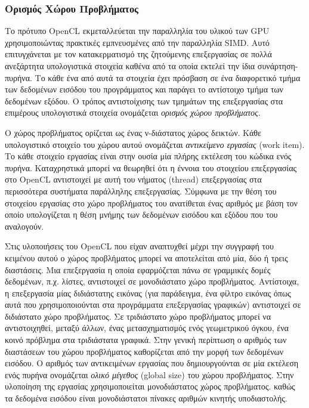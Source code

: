 \subsubsection*{Ορισμός Χώρου Προβλήματος}

\noindent Το πρότυπο OpenCL εκμεταλλεύεται την παραλληλία του υλικού των GPU χρησιμοποιώντας πρακτικές εμπνευσμένες από την παραλληλία SIMD. Αυτό επιτυγχάνεται με τον κατακερματισμό της ζητούμενης επεξεργασίας σε πολλά ανεξάρτητα υπολογιστικά στοιχεία καθένα από τα οποία εκτελεί την ίδια  συνάρτηση-πυρήνα. Το κάθε ένα από αυτά τα στοιχεία έχει πρόσβαση σε ένα διαφορετικό τμήμα των δεδομένων εισόδου του προγράμματος και παράγει το αντίστοιχο τμήμα των δεδομένων εξόδου. Ο τρόπος αντιστοίχισης των τμημάτων της επεξεργασίας στα επιμέρους υπολογιστικά στοιχεία ονομάζεται \textit{ορισμός χώρου προβλήματος}.

Ο χώρος προβλήματος ορίζεται ως ένας ν-διάστατος χώρος δεικτών. Κάθε υπολογιστικό στοιχείο του χώρου αυτού ονομάζεται \textit{αντικείμενο εργασίας} (work item). Το κάθε στοιχείο εργασίας είναι στην ουσία μία πλήρης εκτέλεση του κώδικα ενός πυρήνα. Καταχρηστικά μπορεί να θεωρηθεί ότι η έννοια του στοιχείου επεξεργασίας στο OpenCL αντιστοιχεί με αυτή του νήματος (thread) επεξεργασίας στα περισσότερα συστήματα παράλληλης επεξεργασίας. Σύμφωνα με την θέση του στοιχείου εργασίας στο χώρο προβλήματος του ανατίθεται ένας αριθμός με βάση τον οποίο υπολογίζεται η θέση μνήμης των δεδομένων εισόδου και εξόδου που του αναλογούν. 
 
Στις υλοποιήσεις του OpenCL που είχαν αναπτυχθεί μέχρι την συγγραφή του κειμένου αυτού ο χώρος προβλήματος μπορεί να αποτελείται από μία, δύο ή τρεις διαστάσεις. Μια επεξεργασία η οποία εφαρμόζεται πάνω σε γραμμικές δομές δεδομένων, π.χ. λίστες, αντιστοιχεί σε μονοδιάστατο χώρο προβλήματος. Αντίστοιχα, η επεξεργασία μίας διδιάστατης εικόνας (για παράδειγμα, ένα φίλτρο εικόνας όπως αυτά που χρησιμοποιούνται στα προγράμματα επεξεργασίας γραφικών) αντιστοιχεί σε διδιάστατο χώρο προβλήματος. Σε τριδιάστατο χώρο προβλήματος μπορεί να αντιστοιχηθεί, μεταξύ άλλων, ένας μετασχηματισμός ενός γεωμετρικού όγκου, ένα κοινό πρόβλημα στα τριδιάστατα γραφικά. Στην γενική περίπτωση ο αριθμός των διαστάσεων του χώρου προβλήματος καθορίζεται από την μορφή των δεδομένων εισόδου. Ο αριθμός των αντικειμένων εργασίας που δημιουργούνται σε μία εκτέλεση ενός πυρήνα ονομάζεται \textit{ολικό μέγεθος} (global size) του χώρου προβλήματος. Στην υλοποίηση της εργασίας χρησιμοποιείται μονοδιάστατος χώρος προβλήματος. καθώς τα δεδομένα 
εισόδου είναι μονοδιάστατοι πίνακες αριθμών κινητής υποδιαστολής.

